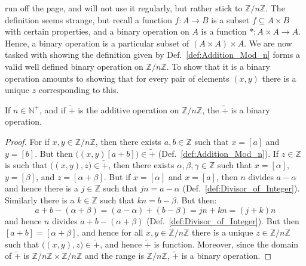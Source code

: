 \documentclass{article}                                                        %
\begin{document}
            run off the page, and will not use it regularly, but rather stick
            to $\mathbb{Z}/n\mathbb{Z}$. The definition seems strange, but
            recall a function $f:A\rightarrow{B}$ is a subset
            $f\subseteq{A}\times{B}$ with certain properties, and a binary
            operation on $A$ is a function $*:A\times{A}\rightarrow{A}$. Hence,
            a binary operation is a particular subset of
            $(A\times{A})\times{A}$. We are now tasked with showing the
            definition given by Def.~\ref{def:Addition_Mod_n} forms a valid well
            defined binary operation on $\mathbb{Z}/n\mathbb{Z}$. To show that
            it is a binary operation amounts to showing that for every pair of
            elements $(x,y)$ there is a unique $z$ corresponding to this.
            \begin{theorem}
                \label{thm:Mod_Addition_is_Bin_Op}%
                If $n\in\mathbb{N}^{+}$, and if $\tilde{+}$ is the additive
                operation on $\mathbb{Z}/n\mathbb{Z}$, the $\tilde{+}$ is a
                binary operation.
            \end{theorem}
            \begin{proof}
                For if $x,y\in\mathbb{Z}/n\mathbb{Z}$, then there exists
                $a,b\in\mathbb{Z}$ such that $x=[a]$ and $y=[b]$. But then
                $\big((x,y)[a+b]\big)\in\tilde{+}$
                (Def.~\ref{def:Addition_Mod_n}). If $z\in\mathbb{Z}$ is such
                that $\big((x,y),z\big)\in\tilde{+}$, then there exists
                $\alpha,\beta,\gamma\in\mathbb{Z}$ such that
                $x=[\alpha]$, $y=[\beta]$, and $z=[\alpha+\beta]$. But if
                $x=[\alpha]$ and $x=[a]$, then $n$ divides $a-\alpha$ and hence
                there is a $j\in\mathbb{Z}$ such that $jn=a-\alpha$
                (Def.~\ref{def:Divisor_of_Integer}). Similarly there is a
                $k\in\mathbb{Z}$ such that $kn=b-\beta$. But then:
                \begin{equation}
                    a+b-(\alpha+\beta)=(a-\alpha)+(b-\beta)=jn+kn=(j+k)n
                \end{equation}
                and hence $n$ divides $a+b-(\alpha+\beta)$
                (Def.~\ref{def:Divisor_of_Integer}). But then
                $[a+b]=[\alpha+\beta]$, and hence for all
                $x,y\in\mathbb{Z}/n\mathbb{Z}$ there is a unique
                $z\in\mathbb{Z}/n\mathbb{Z}$ such that
                $\big((x,y),z\big)\in\tilde{+}$, and hence $\tilde{+}$ is
                function. Moreover, since the domain of $\tilde{+}$ is
                $\mathbb{Z}/n\mathbb{Z}\times\mathbb{Z}/n\mathbb{Z}$ and the
                range is $\mathbb{Z}/n\mathbb{Z}$, $\tilde{+}$ is a binary
                operation.
            \end{proof}
\end{document}
